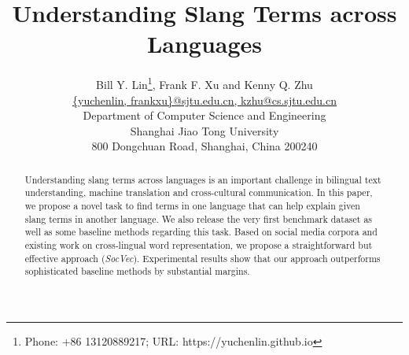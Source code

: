 \documentclass[letterpaper]{article} %
\newcommand{\socvec}{SocVec}
\begin{document}
%
\title{Understanding Slang Terms across Languages}
\author{
		Bill Y. Lin\thanks{Phone: +86 13120889217; URL: https://yuchenlin.github.io},
		Frank F. Xu and
		Kenny Q. Zhu
		\\[0.5ex]
		\url{{yuchenlin, frankxu}@sjtu.edu.cn, kzhu@cs.sjtu.edu.cn}\\[0.5ex]
		Department of Computer Science and Engineering\\[0.5ex]
		Shanghai Jiao Tong University\\[0.5ex]
		800 Dongchuan Road, Shanghai, China 200240
}
\maketitle
\begin{abstract}
Understanding slang terms across languages is an important challenge in bilingual text understanding, machine translation and cross-cultural communication.
In this paper, we propose a novel task to  find terms in one language that can help explain given slang terms in another language. 
We also release the very first benchmark dataset as well as some baseline methods regarding this task.
Based on social media corpora and existing work on cross-lingual word representation, we propose a straightforward but effective approach (\textit{\socvec}). 
Experimental results show that our approach outperforms  sophisticated baseline methods by 
substantial margins.
\end{abstract}
\begin{CJK}{UTF8}{gkai}
	 
%	
%	
%	
%	 
	
	
	
\end{CJK}
\end{document}
